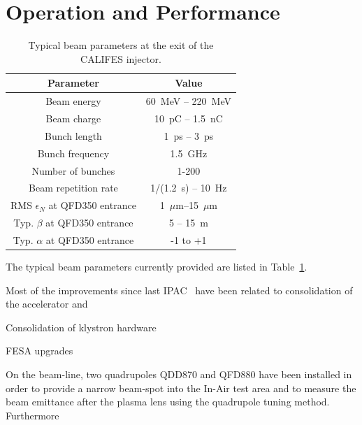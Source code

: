 \documentclass[a4paper,
               keeplastbox,   %
               ]{jacow}
\begin{document}
\section{Operation and Performance}

\begin{table}[b]
    \centering
    \caption{Typical beam parameters at the exit of the CALIFES injector.}
    \label{tab:beamparameters}
    \begin{tabular}{c c}
        \toprule
        \textbf{Parameter} & \textbf{Value} \\
        \midrule
        Beam energy       &  60~MeV -- 220~MeV\\
        Beam charge       &  10~pC  -- 1.5~nC \\
        Bunch length      &   1~ps  -- 3~ps \\
        Bunch frequency   &   1.5~GHz \\
        Number of bunches &  1-200 \\
        Beam repetition rate   & 1/(1.2~s) -- 10~Hz \\
        RMS $\epsilon_N$ at QFD350 entrance & 1~$\mu$m--15~$\mu$m\\
        Typ. $\beta$ at QFD350 entrance & 5 -- 15~m \\
        Typ. $\alpha$ at QFD350 entrance & -1 to +1 \\
        \bottomrule
    \end{tabular}
\end{table}


The typical beam parameters currently provided are listed in Table~\ref{tab:beamparameters}.

Most of the improvements since last IPAC~\cite{Corsini:FirstCLEAR} have been related to consolidation of the accelerator and 

Consolidation of klystron hardware

FESA upgrades

On the beam-line, two quadrupoles QDD870 and QFD880 have been installed in order to provide a narrow beam-spot into the In-Air test area and to measure the beam emittance after the plasma lens using the quadrupole tuning method.
Furthermore 
\end{document}
